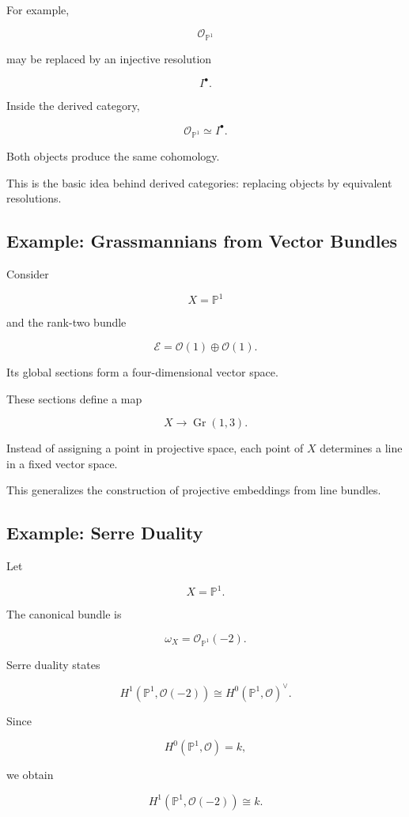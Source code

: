 \documentclass[12pt,a4paper]{article}
\theoremstyle{notespace}
\begin{document}
For example,

\[
\mathcal O_{\mathbb P^1}
\]

may be replaced by an injective resolution

\[
I^\bullet.
\]

Inside the derived category,

\[
\mathcal O_{\mathbb P^1}
\simeq
I^\bullet.
\]

Both objects produce the same cohomology.

This is the basic idea behind derived categories: replacing objects by equivalent resolutions.

\subsection{Example: Grassmannians from Vector Bundles}

Consider

\[
X=\mathbb P^1
\]

and the rank-two bundle

\[
\mathcal E
=
\mathcal O(1)\oplus\mathcal O(1).
\]

Its global sections form a four-dimensional vector space.

These sections define a map

\[
X
\to
\operatorname{Gr}(1,3).
\]

Instead of assigning a point in projective space, each point of \(X\) determines a line in a fixed vector space.

This generalizes the construction of projective embeddings from line bundles.

\subsection{Example: Serre Duality}

Let

\[
X=\mathbb P^1.
\]

The canonical bundle is

\[
\omega_X
=
\mathcal O_{\mathbb P^1}(-2).
\]

Serre duality states

\[
H^1(\mathbb P^1,\mathcal O(-2))
\cong
H^0(\mathbb P^1,\mathcal O)^\vee.
\]

Since

\[
H^0(\mathbb P^1,\mathcal O)
=
k,
\]

we obtain

\[
H^1(\mathbb P^1,\mathcal O(-2))
\cong
k.
\]
\end{document}
